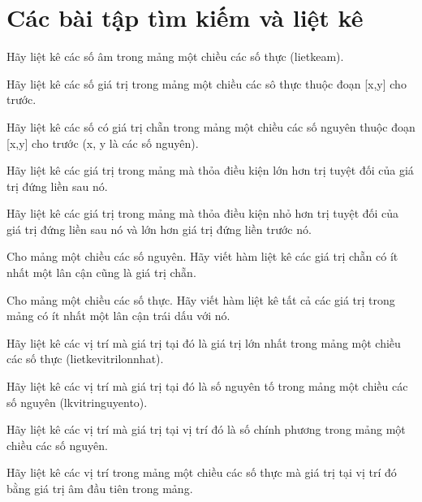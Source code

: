 \section{Các bài tập tìm kiếm và liệt kê}

\begin{problem}
    Hãy liệt kê các số âm trong mảng một chiều các số thực (lietkeam).
\end{problem}
\begin{problem}
    Hãy liệt kê các số giá trị trong mảng một chiều các sô thực thuộc đoạn [x,y] cho trước.
\end{problem}
\begin{problem}
    Hãy liệt kê các số có giá trị chẵn trong mảng một chiều các số nguyên thuộc đoạn [x,y] cho trước (x, y là các số nguyên).
\end{problem}
\begin{problem}
    Hãy liệt kê các giá trị trong mảng mà thỏa điều kiện lớn hơn trị tuyệt đối của giá trị đứng liền sau nó.
\end{problem}
\begin{problem}
    Hãy liệt kê các giá trị trong mảng mà thỏa điều kiện nhỏ hơn trị tuyệt đối của giá trị đứng liền sau nó và lớn hơn giá trị đứng liền trước nó.
\end{problem}
\begin{problem}
    Cho mảng một chiều các số nguyên. Hãy viết hàm liệt kê các giá trị chẵn có ít nhất một lân cận cũng là giá trị chẵn.
\end{problem}
\begin{problem}
    Cho mảng một chiều các số thực. Hãy viết hàm liệt kê tất cả các giá trị trong mảng có ít nhất một lân cận trái dấu với nó.
\end{problem}
\begin{problem}
    Hãy liệt kê các vị trí mà giá trị tại đó là giá trị lớn nhất trong mảng một chiều các số thực (lietkevitrilonnhat).
\end{problem}
\begin{problem}
    Hãy liệt kê các vị trí mà giá trị tại đó là số nguyên tố trong mảng một chiều các số nguyên (lkvitringuyento).
\end{problem}
\begin{problem}
    Hãy liệt kê các vị trí mà giá trị tại vị trí đó là số chính phương trong mảng một chiều các số nguyên.
\end{problem}
\begin{problem}
    Hãy liệt kê các vị trí trong mảng một chiều các số thực mà giá trị tại vị trí đó bằng giá trị âm đầu tiên trong mảng.
\end{problem}
